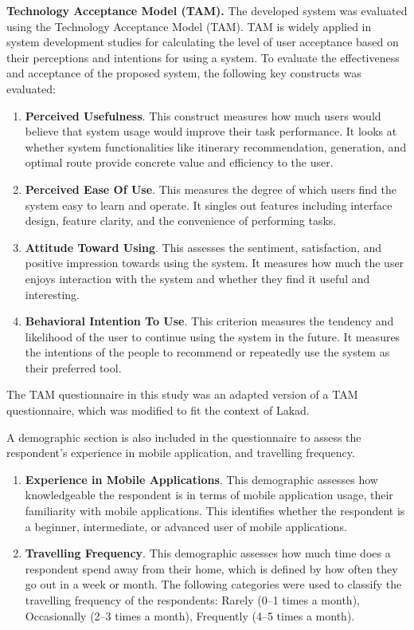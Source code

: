 \textbf{Technology Acceptance Model (TAM).} The developed system was evaluated using the Technology Acceptance Model (TAM). TAM is widely applied in system development studies for calculating the level of user acceptance based on their perceptions and intentions for using a system. To evaluate the effectiveness and acceptance of the proposed system, the following key constructs was evaluated:
\begin{enumerate}
	\item \textbf{Perceived Usefulness}. This construct measures how much users would believe that system usage would improve their task performance. It looks at whether system functionalities like itinerary recommendation, generation, and optimal route provide concrete value and efficiency to the user.
	\item \textbf{Perceived Ease Of Use}. This measures the degree of which users find the system easy to learn and operate. It singles out features including interface design, feature clarity, and the convenience of performing tasks.
	\item \textbf{Attitude Toward Using}. This assesses the sentiment, satisfaction, and positive impression towards using the system. It measures how much the user enjoys interaction with the system and whether they find it useful and interesting.
	\item \textbf{Behavioral Intention To Use}. This criterion measures the tendency and likelihood of the user to continue using the system in the future. It measures the intentions of the people to recommend or repeatedly use the system as their preferred tool.
\end{enumerate}

The TAM questionnaire in this study was an adapted version of a TAM questionnaire, which was modified to fit the context of Lakad. 

\newpage
A demographic section is also included in the questionnaire to assess the respondent’s experience in mobile application, and travelling frequency.

\begin{enumerate}
	\item \textbf{Experience in Mobile Applications}. This demographic assesses how knowledgeable the respondent is in terms of mobile application usage, their familiarity with mobile applications. This identifies whether the respondent is a beginner, intermediate, or advanced user of mobile applications. 
	

	\item \textbf{Travelling Frequency}. This demographic assesses how much time does a respondent spend away from their home, which is defined by how often they go out in a week or month. The following categories were used to classify the travelling frequency of the respondents: Rarely (0–1 times a month), Occasionally (2–3 times a month), Frequently (4–5 times a month).
\end{enumerate}

